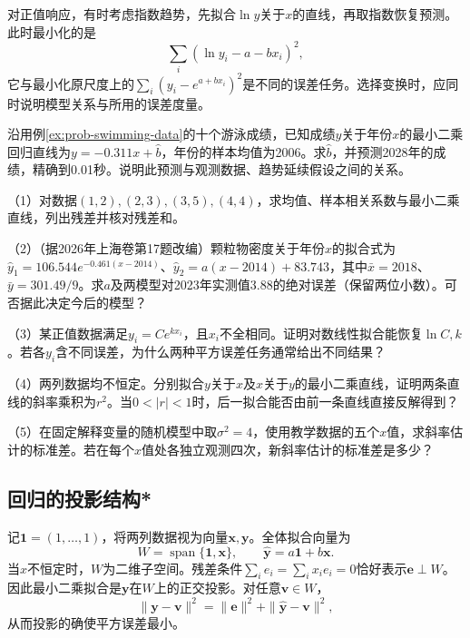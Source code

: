 对正值响应，有时考虑指数趋势，先拟合\(\ln y\)关于\(x\)的直线，再取指数恢复预测。此时最小化的是
\[
 \sum_i(\ln y_i-a-bx_i)^2,
\]
它与最小化原尺度上的\(\sum_i(y_i-e^{a+bx_i})^2\)是不同的误差任务。选择变换时，应同时说明模型关系与所用的误差度量。

\begin{example}[据2025年上海卷改编]
沿用例\ref{ex:prob-swimming-data}的十个游泳成绩，已知成绩\(y\)关于年份\(x\)的最小二乘回归直线为\(y=-0.311x+\widehat b\)，年份的样本均值为2006。求\(\widehat b\)，并预测2028年的成绩，精确到0.01秒。说明此预测与观测数据、趋势延续假设之间的关系。
\end{example}

\begin{exercise}
\mbox{}\par\nobreak

（1）对数据\((1,2),(2,3),(3,5),(4,4)\)，求均值、样本相关系数与最小二乘直线，列出残差并核对残差和。

（2）（据2026年上海卷第17题改编）颗粒物密度关于年份\(x\)的拟合式为\(\widehat y_1=106.544e^{-0.461(x-2014)}\)、\(\widehat y_2=a(x-2014)+83.743\)，其中\(\bar x=2018\)、\(\bar y=301.49/9\)。求\(a\)及两模型对2023年实测值3.88的绝对误差（保留两位小数）。可否据此决定今后的模型？

（3）某正值数据满足\(y_i=C e^{kx_i}\)，且\(x_i\)不全相同。证明对数线性拟合能恢复\(\ln C,k\)。若各\(y_i\)含不同误差，为什么两种平方误差任务通常给出不同结果？

（4）两列数据均不恒定。分别拟合\(y\)关于\(x\)及\(x\)关于\(y\)的最小二乘直线，证明两条直线的斜率乘积为\(r^2\)。当\(0<|r|<1\)时，后一拟合能否由前一条直线直接反解得到？

（5）在固定解释变量的随机模型中取\(\sigma^2=4\)，使用教学数据的五个\(x\)值，求斜率估计的标准差。若在每个\(x\)值处各独立观测四次，新斜率估计的标准差是多少？
\end{exercise}

\FloatBarrier
\newpage
\subsection{回归的投影结构*}

记\(\boldsymbol1=(1,\ldots,1)\)，将两列数据视为向量\(\boldsymbol x,\boldsymbol y\)。全体拟合向量为
\[
 W=\operatorname{span}\{\boldsymbol1,\boldsymbol x\},\qquad
 \widehat{\boldsymbol y}=a\boldsymbol1+b\boldsymbol x.
\]
当\(x\)不恒定时，\(W\)为二维子空间。残差条件\(\sum_ie_i=\sum_ix_ie_i=0\)恰好表示\(\boldsymbol e\perp W\)。因此最小二乘拟合是\(\boldsymbol y\)在\(W\)上的正交投影。对任意\(\boldsymbol v\in W\)，
\[
 \|\boldsymbol y-\boldsymbol v\|^2
 =\|\boldsymbol e\|^2+\|\widehat{\boldsymbol y}-\boldsymbol v\|^2,
\]
从而投影的确使平方误差最小。

